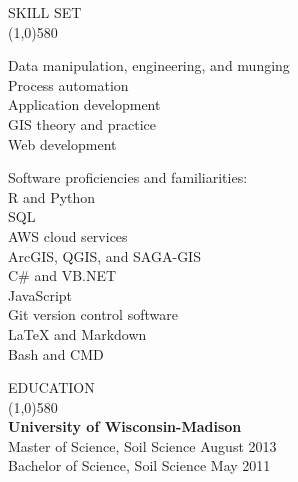 \documentclass{article}
\begin{document}
\noindent \large{SKILL SET}\\ 
\line(1,0){580}\\
\parbox[t][3cm][t]{0.4\textwidth}{
	\textbullet Data manipulation, engineering, and munging\\
	\textbullet Process automation\\
	\textbullet Application development\\
	\textbullet GIS theory and practice\\
	\textbullet Web development\\

} 
\parbox[t][2.5cm][t]{0.07\textwidth}{\hfil}
\parbox[t][3.2cm][t]{0.45\textwidth}{
	Software proficiencies and familiarities:\\
	\small{
		\textbullet R and Python\\
		\textbullet SQL\\
		\textbullet AWS cloud services\\
		\textbullet ArcGIS, QGIS, and SAGA-GIS\\
		\textbullet C\# and VB.NET\\
		\textbullet JavaScript\\
		\textbullet Git version control software\\
		\textbullet \LaTeX{} and Markdown\\
		\textbullet Bash and CMD\\
	}
}

\noindent \large{EDUCATION}\\
\line(1,0){580}\\ \normalsize
\textbf{University of Wisconsin-Madison}\\
Master of Science, Soil Science \hfill August 2013\\ %
\noindent Bachelor of Science, Soil Science \hfill May 2011\\ %
\end{document}
